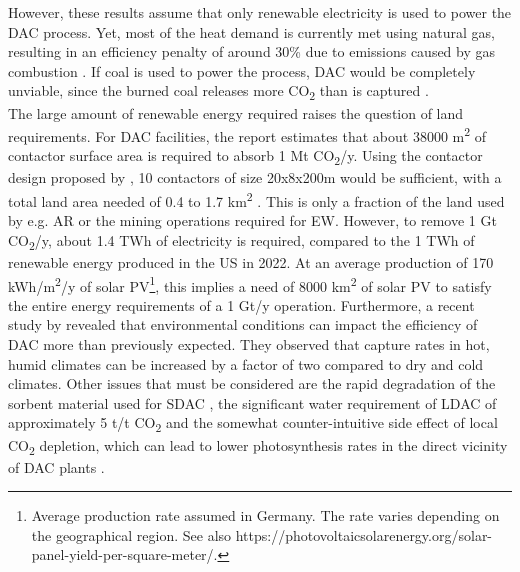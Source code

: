 However, these results assume that only renewable electricity is used to power the DAC process. Yet, most of the heat demand is currently met using natural gas, resulting in an efficiency penalty of around 30\% due to emissions caused by gas combustion \parencite{Fuss2018NegativeEffects}. If coal is used to power the process, DAC would be completely unviable, since the burned coal releases more CO\textsubscript{2} than is captured \parencite{Erans2022DirectChallenges, NRC2015ClimateSequestration}.\\
The large amount of renewable energy required raises the question of land requirements. For DAC facilities, the \textcite{NAS2018NegativeAgenda} report estimates that about 38000 m\textsuperscript{2} of contactor surface area is required to absorb 1 Mt CO\textsubscript{2}/y. Using the contactor design proposed by \textcite{Holmes2012AnAir}, 10 contactors of size 20x8x200m would be sufficient, with a total land area needed of 0.4 to 1.7 km\textsuperscript{2} \parencite[23]{IEA2022DirectZero}. This is only a fraction of the land used by e.g. AR or the mining operations required for EW.
However, to remove 1 Gt CO\textsubscript{2}/y, about 1.4 TWh of electricity is required, compared to the 1 TWh of renewable energy produced in the US in 2022. At an average production of 170 kWh/m\textsuperscript{2}/y of solar PV\footnote{Average production rate assumed in Germany. The rate varies depending on the geographical region. See also https://photovoltaicsolarenergy.org/solar-panel-yield-per-square-meter/.}, this implies a need of 8000 km\textsuperscript{2} of solar PV to satisfy the entire energy requirements of a 1 Gt/y operation.
Furthermore, a recent study by \textcite{An2022TheSystems} revealed that environmental conditions can impact the efficiency of DAC more than previously expected. They observed that capture rates in hot, humid climates can be increased by a factor of two compared to dry and cold climates. Other issues that must be considered are the rapid degradation of the sorbent material used for SDAC \parencite{Lawler2022WhatTechnology}, the significant water requirement of LDAC of approximately 5 t/t CO\textsubscript{2} \parencite{IEA2022DirectZero} and the somewhat counter-intuitive side effect of local CO\textsubscript{2} depletion, which can lead to lower photosynthesis rates in the direct vicinity of DAC plants \parencite[230]{NAS2018NegativeAgenda}.

